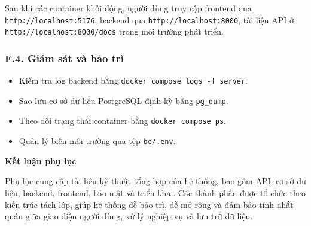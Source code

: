\documentclass[13pt,a4paper]{extarticle}
\numberwithin{figure}{section}
\numberwithin{table}{section}
\begin{document}
	\noindent
	Sau khi các container khởi động, người dùng truy cập frontend qua \texttt{http://localhost:5176}, backend qua \texttt{http://localhost:8000}, tài liệu API ở \texttt{http://localhost:8000/docs} trong môi trường phát triển.
	
	\subsubsection*{F.4. Giám sát và bảo trì}
	
	\noindent
	\begin{itemize}
		\item Kiểm tra log backend bằng \texttt{docker compose logs -f server}.
		\item Sao lưu cơ sở dữ liệu PostgreSQL định kỳ bằng \texttt{pg\_dump}.
		\item Theo dõi trạng thái container bằng \texttt{docker compose ps}.
		\item Quản lý biến môi trường qua tệp \texttt{be/.env}.
	\end{itemize}
	
	\noindent
	\textbf{Kết luận phụ lục}
	
	Phụ lục cung cấp tài liệu kỹ thuật tổng hợp của hệ thống, bao gồm API, cơ sở dữ liệu, backend, frontend, bảo mật và triển khai. Các thành phần được tổ chức theo kiến trúc tách lớp, giúp hệ thống dễ bảo trì, dễ mở rộng và đảm bảo tính nhất quán giữa giao diện người dùng, xử lý nghiệp vụ và lưu trữ dữ liệu.
	
\end{document}
